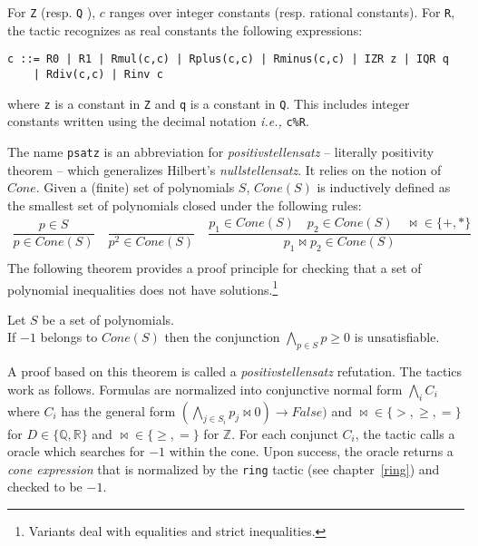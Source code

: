 For {\tt Z} (resp. {\tt Q} ), $c$ ranges over integer constants (resp. rational constants).
For {\tt R}, the tactic recognizes as real constants the following expressions:
\begin{verbatim}
c ::= R0 | R1 | Rmul(c,c) | Rplus(c,c) | Rminus(c,c) | IZR z | IQR q
    | Rdiv(c,c) | Rinv c
\end{verbatim}
where {\tt z} is a constant in {\tt Z} and {\tt q} is a constant in {\tt Q}.
This includes integer constants written using the decimal notation \emph{i.e.,} {\tt c\%R}.

\label{sec:psatz-back}

The name {\tt psatz} is an abbreviation for \emph{positivstellensatz} -- literally positivity theorem -- which
generalizes Hilbert's \emph{nullstellensatz}.
%
It relies on the notion of $\mathit{Cone}$. Given a (finite) set of
polynomials $S$, $\mathit{Cone}(S)$ is inductively defined as the
smallest set of polynomials closed under the following rules:
\[
\begin{array}{l}
\dfrac{p \in S}{p \in \mathit{Cone}(S)} \quad
\dfrac{}{p^2 \in \mathit{Cone}(S)} \quad
\dfrac{p_1 \in \mathit{Cone}(S) \quad p_2 \in \mathit{Cone}(S) \quad
\Join \in \{+,*\}} {p_1 \Join p_2 \in \mathit{Cone}(S)}\\
\end{array}
\]
The following theorem provides a proof principle for checking that a set
of polynomial inequalities does not have solutions.\footnote{Variants
  deal with equalities and strict inequalities.}
\begin{theorem}
  \label{thm:psatz}
  Let $S$ be a set of polynomials.\\
  If ${-}1$ belongs to $\mathit{Cone}(S)$ then the conjunction
  $\bigwedge_{p \in S} p\ge 0$ is unsatisfiable.
\end{theorem}
A proof based on this theorem is called a \emph{positivstellensatz} refutation.
%
The tactics work as follows. Formulas are normalized into conjunctive normal form $\bigwedge_i C_i$ where
$C_i$ has the general form $(\bigwedge_{j\in S_i} p_j \Join 0) \to \mathit{False})$ and $\Join \in \{>,\ge,=\}$ for $D\in
\{\mathbb{Q},\mathbb{R}\}$ and $\Join \in \{\ge, =\}$ for $\mathbb{Z}$.
%
For each conjunct $C_i$, the tactic calls a oracle which searches for $-1$ within the cone.
%
Upon success, the oracle returns a \emph{cone expression} that is normalized by the {\tt ring} tactic (see chapter~\ref{ring}) and checked to be
$-1$.


